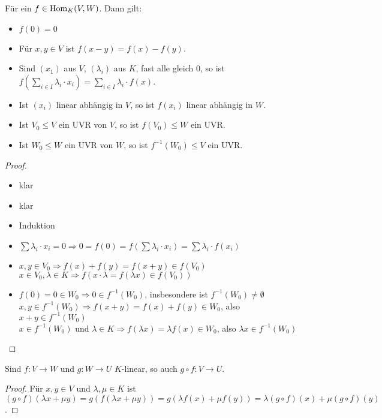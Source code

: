 \begin{proposition}
	Für ein $f\in \operatorname{Hom}_K(V,W)$. Dann gilt:
	\begin{itemize}
		\item $f(0)=0$
		\item Für $x,y\in V$ ist $f(x-y)=f(x)-f(y)$.
		\item Sind $(x_1)$ aus $V$, $(\lambda_i)$ aus $K$, fast alle gleich 0, so ist $f(\sum_{i\in I} \lambda_i
		\cdot x_i)=\sum_{i\in I} \lambda_i\cdot f(x)$.
		\item Ist $(x_i)$ linear abhängig in $V$, so ist $f(x_i)$ linear abhängig in $W$.
		\item Ist $V_0\le V$ ein UVR von $V$, so ist $f(V_0)\le W$ ein UVR.
		\item Ist $W_0\le W$ ein UVR von $W$, so ist $f^{-1}(W_0)\le V$ ein UVR.
	\end{itemize}
\end{proposition}
\begin{proof}
	\begin{itemize}
		\item klar
		\item klar
		\item Induktion
		\item $\sum \lambda_i\cdot x_i=0\Rightarrow 0=f(0)=f(\sum \lambda_i\cdot x_i)=\sum \lambda_i\cdot f(x_i)$
		\item $x,y\in V_0\Rightarrow f(x)+f(y)=f(x+y)\in f(V_0)$ \\ 
		$x\in V_0,\lambda\in K\Rightarrow f(x\cdot \lambda= f(\lambda x)\in f(V_0))$
		\item $f(0)=0\in W_0\Rightarrow 0\in f^{-1}(W_0)$, insbesondere ist $f^{-1}(W_0)\neq \emptyset$ \\ 
		$x,y\in f^{-1}(W_0)\Rightarrow f(x+y)=f(x)+f(y)\in W_0$, also $x+y\in f^{-1}(W_0)$ \\
		$x\in f^{-1}(W_0)$ und $\lambda\in K\Rightarrow f(\lambda x)=\lambda f(x)\in W_0$, also $\lambda x\in f^{-1}(W_0)$
	\end{itemize}
\end{proof}

\begin{proposition}
	Sind $f:V\to W$ und $g:W\to U$ $K$-linear, so auch $g\circ f: V\to U$.
\end{proposition}
\begin{proof}
	Für $x,y\in V$ und $\lambda,\mu\in K$ ist $(g\circ f)(\lambda x + \mu y)=g(f(\lambda x + \mu y))=g(\lambda f(x) + 
	\mu f(y))=\lambda (g\circ f)(x) + \mu (g\circ f)(y)$.
\end{proof}

